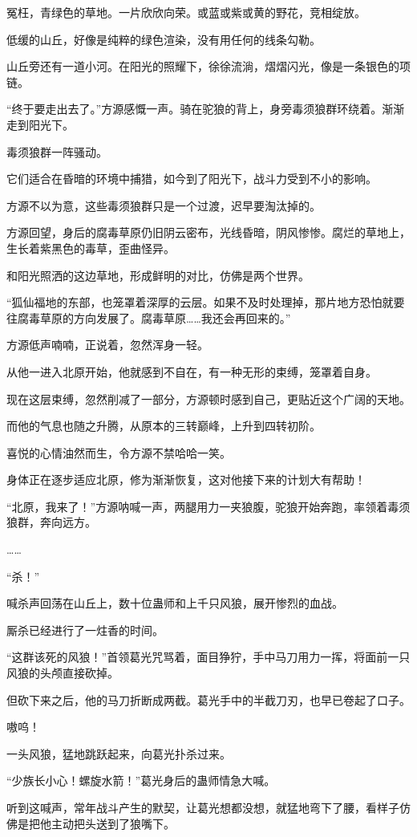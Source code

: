 \begin{this_body}
冤枉，青绿色的草地。一片欣欣向荣。或蓝或紫或黄的野花，竞相绽放。

低缓的山丘，好像是纯粹的绿色渲染，没有用任何的线条勾勒。

山丘旁还有一道小河。在阳光的照耀下，徐徐流淌，熠熠闪光，像是一条银色的项链。

“终于要走出去了。”方源感慨一声。骑在驼狼的背上，身旁毒须狼群环绕着。渐渐走到阳光下。

毒须狼群一阵骚动。

它们适合在昏暗的环境中捕猎，如今到了阳光下，战斗力受到不小的影响。

方源不以为意，这些毒须狼群只是一个过渡，迟早要淘汰掉的。

方源回望，身后的腐毒草原仍旧阴云密布，光线昏暗，阴风惨惨。腐烂的草地上，生长着紫黑色的毒草，歪曲怪异。

和阳光照洒的这边草地，形成鲜明的对比，仿佛是两个世界。

“狐仙福地的东部，也笼罩着深厚的云层。如果不及时处理掉，那片地方恐怕就要往腐毒草原的方向发展了。腐毒草原……我还会再回来的。”

方源低声喃喃，正说着，忽然浑身一轻。

从他一进入北原开始，他就感到不自在，有一种无形的束缚，笼罩着自身。

现在这层束缚，忽然削减了一部分，方源顿时感到自己，更贴近这个广阔的天地。

而他的气息也随之升腾，从原本的三转巅峰，上升到四转初阶。

喜悦的心情油然而生，令方源不禁哈哈一笑。

身体正在逐步适应北原，修为渐渐恢复，这对他接下来的计划大有帮助！

“北原，我来了！”方源呐喊一声，两腿用力一夹狼腹，驼狼开始奔跑，率领着毒须狼群，奔向远方。

……

“杀！”

喊杀声回荡在山丘上，数十位蛊师和上千只风狼，展开惨烈的血战。

厮杀已经进行了一炷香的时间。

“这群该死的风狼！”首领葛光咒骂着，面目狰狞，手中马刀用力一挥，将面前一只风狼的头颅直接砍掉。

但砍下来之后，他的马刀折断成两截。葛光手中的半截刀刃，也早已卷起了口子。

嗷呜！

一头风狼，猛地跳跃起来，向葛光扑杀过来。

“少族长小心！螺旋水箭！”葛光身后的蛊师情急大喊。

听到这喊声，常年战斗产生的默契，让葛光想都没想，就猛地弯下了腰，看样子仿佛是把他主动把头送到了狼嘴下。


\end{this_body}
